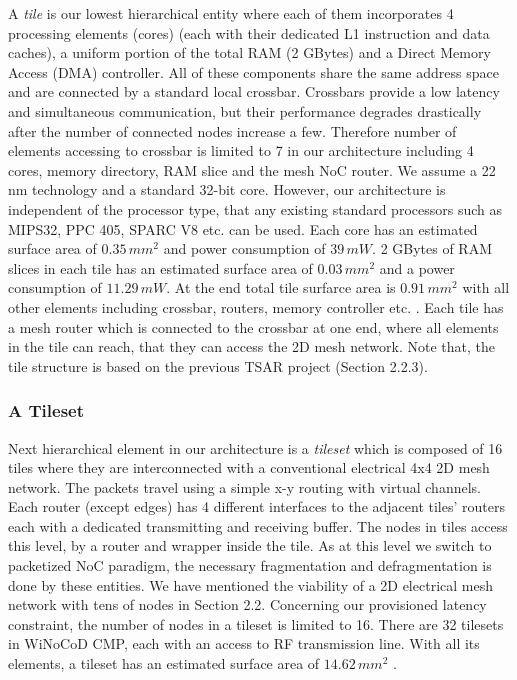 A \textit{tile} is our lowest hierarchical entity where each of them incorporates 4 processing elements (cores) (each with their dedicated L1 instruction and data caches), a uniform portion of the total RAM (2 GBytes) and a Direct Memory Access (DMA) controller. All of these components share the same address space and are connected by a standard local crossbar. Crossbars provide a low latency and simultaneous communication, but their performance degrades drastically after the number of connected nodes increase a few. Therefore number of elements accessing to crossbar is limited to 7 in our architecture including 4 cores, memory directory, RAM slice and the mesh NoC router. We assume a 22 nm technology and a standard 32-bit core. However, our architecture is independent of the processor type, that any existing standard processors such as MIPS32, PPC 405, SPARC V8 etc. can be used. Each core has an estimated surface area of $0.35 \, mm^{2}$ and power consumption of $39 \, mW$. 2 GBytes of RAM slices in each tile has an estimated surface area of $0.03 \, mm^{2}$ and a power consumption of $11.29 \, mW$. At the end total tile surfarce area is $0.91 \, mm^{2}$ with all other elements including crossbar, routers, memory controller etc. \cite{briere2014winocod}. Each tile has a mesh router which is connected to the crossbar at one end, where all elements in the tile can reach, that they can access the 2D mesh network. Note that, the tile structure is based on the previous TSAR project (Section 2.2.3).

\subsubsection{A Tileset}

Next hierarchical element in our architecture is a \textit{tileset} which is composed of 16 tiles where they are interconnected with a conventional electrical 4x4 2D mesh network. The packets travel using a simple x-y routing with virtual channels. Each router (except edges) has 4 different interfaces to the adjacent tiles' routers each with a dedicated transmitting and receiving buffer. The nodes in tiles access this level, by a router and wrapper inside the tile. As at this level we switch to packetized NoC paradigm, the necessary fragmentation and defragmentation is done by these entities. We have mentioned the viability of a 2D electrical mesh network with tens of nodes in Section 2.2. Concerning our provisioned latency constraint, the number of nodes in a tileset is limited to 16. There are 32 tilesets in WiNoCoD CMP, each with an access to RF transmission line. With all its elements, a tileset has an estimated surface area of $14.62 \, mm^{2}$ \cite{briere2014winocod}. 


